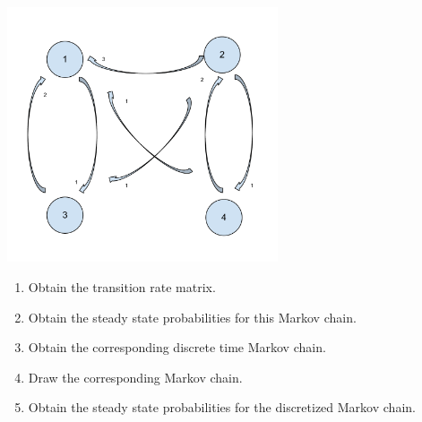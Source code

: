 \documentclass[12pt]{article}
\begin{document}
\begin{enumerate}
\begin{center}
\includegraphics[width=8cm]{Markov_Chains_Ex_5.pdf}
\end{center}

\begin{enumerate}
	\item Obtain the transition rate matrix.
	\item Obtain the steady state probabilities for this Markov chain.
	\item Obtain the corresponding discrete time Markov chain.
	\item Draw the corresponding Markov chain.
	\item Obtain the steady state probabilities for the discretized Markov chain.
\end{enumerate}

\end{enumerate}
\end{document}
